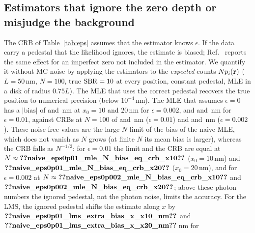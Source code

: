 \subsection{Estimators that ignore the zero depth or misjudge the background}
The CRB of Table~\ref{tab:eps} assumes that the estimator knows $\epsilon$. If the data carry a
pedestal that the likelihood ignores, the estimate is biased; Ref.~\cite{MarinRies2026} reports
the same effect for an imperfect zero not included in the estimator. We quantify it without MC
noise by applying the estimators to the \emph{expected} counts $Np_i(\mathbf{r})$ ($L=50$\,nm,
$N=100$, true $\mathrm{SBR}=10$ at every position, constant pedestal, MLE in a disk of radius $0.75L$).
The MLE that uses the correct pedestal recovers the true position to numerical precision
(below $10^{-4}$\,nm). The MLE that
assumes $\epsilon=0$ has a $|\text{bias}|$ of
 and
\,nm at
$x_0=10$ and $20$\,nm for $\epsilon=0.002$, and
 and
\,nm for
$\epsilon=0.01$, against CRBs at $N=100$ of
 and
\,nm ($\epsilon=0.01$) and
 and
\,nm ($\epsilon=0.002$). These noise-free
values are the large-$N$ limit of the bias of the naive MLE, which does not vanish as $N$ grows
(at finite $N$ its mean bias is larger), whereas the CRB falls as $N^{-1/2}$: for $\epsilon=0.01$
the limit and the CRB are equal
at $N\approx\pnum{naive_eps0p01_mle_N_bias_eq_crb_x10}\src{naive_eps0p01_mle_N_bias_eq_crb_x10}$
($x_0=10$\,nm) and
$\pnum{naive_eps0p01_mle_N_bias_eq_crb_x20}\src{naive_eps0p01_mle_N_bias_eq_crb_x20}$
($x_0=20$\,nm), and for $\epsilon=0.002$ at
$N\approx\pnum{naive_eps0p002_mle_N_bias_eq_crb_x10}\src{naive_eps0p002_mle_N_bias_eq_crb_x10}$
and $\pnum{naive_eps0p002_mle_N_bias_eq_crb_x20}\src{naive_eps0p002_mle_N_bias_eq_crb_x20}$;
above these photon numbers the ignored pedestal, not the photon noise, limits the accuracy.
For the LMS, the ignored pedestal shifts the estimate along $x$ by
$\pnum{naive_eps0p01_lms_extra_bias_x_x10_nm}$ and
$\pnum{naive_eps0p01_lms_extra_bias_x_x20_nm}$\,nm for
